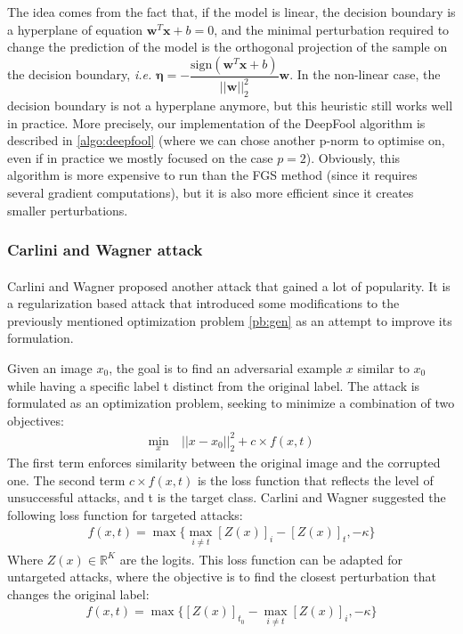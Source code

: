 \documentclass[10pt,twocolumn,letterpaper]{article}
\begin{document}
The idea comes from the fact that, if the model is linear, the decision boundary is a hyperplane of equation $\bm{w}^T\bm{x} + b = 0$, and the minimal perturbation required to change the prediction of the model is the orthogonal projection of the sample on the decision boundary, \textit{i.e.} $\bm{\eta} = - \dfrac{\text{sign}(\bm{w}^T\bm{x} + b)}{||\bm{w}||_2^2} \bm{w}$. In the non-linear case, the decision boundary is not a hyperplane anymore, but this heuristic still works well in practice. More precisely, our implementation of the DeepFool algorithm is described in \ref{algo:deepfool} (where we can chose another p-norm to optimise on, even if in practice we mostly focused on the case $p=2$).
Obviously, this algorithm is more expensive to run than the FGS method (since it requires several gradient computations), but it is also more efficient since it creates smaller perturbations.

\subsubsection{Carlini and Wagner attack}
\paragraph{}
Carlini and Wagner proposed another attack \cite{robustness} that gained a lot of popularity. It is a regularization based attack that introduced some modifications to the previously mentioned optimization problem \ref{pb:gen} as an attempt to improve its formulation.

Given an image $x_0$, the goal is to find an adversarial example $x$ similar to $x_0$ while having a specific label t distinct from the original label. The attack is formulated as an optimization problem, seeking to minimize a combination of two objectives:
\begin{align*}
   \min_x &\ ||x - x_0||_2^2 + c \times f(x,t) %
\end{align*}
The first term enforces similarity between the original image and the corrupted one. The second term $ c \times f(x,t) $ is the loss function that reflects the level of unsuccessful attacks, and t is the target class. Carlini and Wagner suggested the following loss function for targeted attacks:
\begin{align*}
    f(x,t) = \max \{ \max_{i \neq t}[Z(x)]_i - [Z(x)]_t, -\kappa \}
\end{align*}
Where $Z(x) \in \mathbb{R}^K$ are the logits. 
This loss function can be adapted for untargeted attacks, where the objective is to find the closest perturbation that changes the original label:
\begin{align*}
    f(x,t) = \max \{[Z(x)]_{t_0} - \max_{i \neq t}[Z(x)]_i, -\kappa \}
\end{align*}
\end{document}
